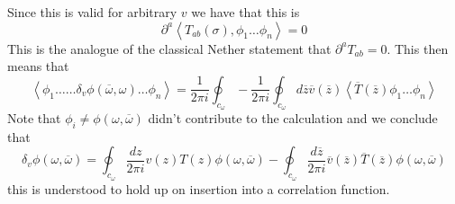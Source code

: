 \documentclass[11pt, oneside]{article}   	%
\theoremstyle{slanted}
\begin{document}
 Since this is valid for arbitrary $ v $ 
 we have that this is 
 \[
	 \partial  ^ a \left< T _{ ab } \left( \sigma  \right), 
	 \phi _ 1 \dots \phi _ n \right>  =0 
 \] This is the analogue of the classical 
 Nether statement that $ \partial  ^ a T _{ ab }  =0  $. 
 This then means that 
 \[
  	\left< \phi _ 1 \dots 
	\dots \delta _ v \phi \left( \overline{ \omega } , \omega  \right)
	\dots \phi _ n \right>  = \frac{1}{2 \pi i } \oint_{ c _{ \omega } } 
			        - \frac{1}{ 2 \pi i } \oint _{ c _ \omega  } 
				d \overline{ z  } \overline{ v } 
				\left( \overline{ z }  \right)  \left< 
				\overline{ T } \left(  \overline{ z }  \right)  
				\phi _ 1 \dots \phi _ n \right> 
 \] 
 Note that $ \phi _ i \neq \phi \left(  \omega, \overline{ \omega }  \right)  $ 
 didn't contribute to the 
 calculation and we conclude that 
 \[
	 \delta _{ v } \phi \left( \omega, 
	 \overline{ \omega } \right)   = 
	 \oint_{ c _ \omega } \frac{d z }{ 2 \pi i } v \left( z  \right)  
	 T \left(  z  \right)  \phi \left( \omega, \overline{ \omega }  \right)   - 
	 \oint _{ c _ \omega } \frac{ d \overline{  z } }{ 2 \pi i } 
	 \overline{ v } \left(  \overline{ z }  \right)  
	 \overline{ T } \left(  \overline{ z }  \right)  \phi 
	 \left( \omega, \overline{ \omega }  \right) 
 \] this is understood to hold up on insertion 
 into a correlation function. 
\end{document}
